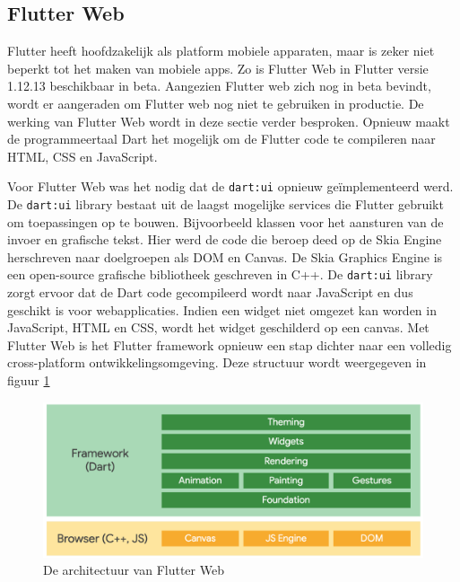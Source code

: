 \subsection{Flutter Web}
Flutter heeft hoofdzakelijk als platform mobiele apparaten, maar is zeker niet beperkt tot het maken van mobiele apps. Zo is Flutter Web in Flutter versie 1.12.13 beschikbaar in beta. Aangezien Flutter web zich nog in beta bevindt, wordt er aangeraden om Flutter web nog niet te gebruiken in productie. De werking van Flutter Web wordt in deze sectie verder besproken.
\newline
Opnieuw maakt de programmeertaal Dart het mogelijk om de Flutter code te compileren naar HTML, CSS en JavaScript.

Voor Flutter Web was het nodig dat de \verb|dart:ui| opnieuw geïmplementeerd werd. De \verb|dart:ui| library bestaat uit de laagst mogelijke services die Flutter gebruikt om toepassingen op te bouwen. Bijvoorbeeld klassen voor het aansturen van de invoer en grafische tekst. Hier werd de code die beroep deed op de Skia Engine herschreven naar doelgroepen als DOM en Canvas. De Skia Graphics Engine is een open-source grafische bibliotheek geschreven in C++. De \verb|dart:ui| library zorgt ervoor dat de Dart code gecompileerd wordt naar JavaScript en dus geschikt is voor webapplicaties. Indien een widget niet omgezet kan worden in JavaScript, HTML en CSS, wordt het widget geschilderd op een canvas.
\newline
Met Flutter Web is het Flutter framework opnieuw een stap dichter naar een volledig cross-platform ontwikkelingsomgeving.
Deze structuur wordt weergegeven in figuur \ref{fig:flutter-web-architecture}
\begin{figure}[H]
    \includegraphics[width=\linewidth]{img/stand-van-zaken/flutter-web-architecture.png}
    \caption{De architectuur van Flutter Web \autocite{Flutter2019}}
    \label{fig:flutter-web-architecture}
\end{figure}


